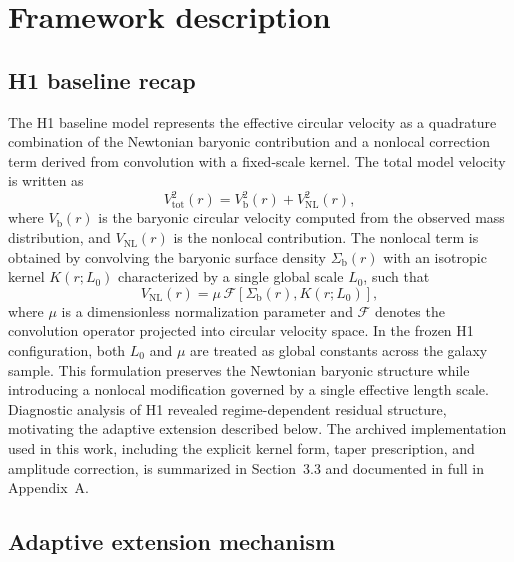 \documentclass[twocolumn,linenumbers]{aastex701}
\begin{document}
\section{Framework description}

\subsection{H1 baseline recap}

The H1 baseline model represents the effective circular velocity as a
quadrature combination of the Newtonian baryonic contribution and a
nonlocal correction term derived from convolution with a fixed-scale
kernel. The total model velocity is written as
\begin{equation}
	V_{\mathrm{tot}}^2(r) = V_{\mathrm{b}}^2(r) + V_{\mathrm{NL}}^2(r),
	\label{eq:vtot}
\end{equation}
where $V_{\mathrm{b}}(r)$ is the baryonic circular velocity computed
from the observed mass distribution, and $V_{\mathrm{NL}}(r)$ is the
nonlocal contribution. The nonlocal term is obtained by convolving the
baryonic surface density $\Sigma_{\mathrm{b}}(r)$ with an isotropic
kernel $K(r; L_0)$ characterized by a single global scale $L_0$, such that
\begin{equation}
	V_{\mathrm{NL}}(r) = \mu \, \mathcal{F}\left[\Sigma_{\mathrm{b}}(r),
	K(r; L_0)\right],
	\label{eq:vnl}
\end{equation}
where $\mu$ is a dimensionless normalization parameter and $\mathcal{F}$
denotes the convolution operator projected into circular velocity space.
In the frozen H1 configuration, both $L_0$ and $\mu$ are treated as global
constants across the galaxy sample. This formulation preserves the Newtonian
baryonic structure while introducing a nonlocal modification governed by a
single effective length scale. Diagnostic analysis of H1 revealed
regime-dependent residual structure, motivating the adaptive extension
described below. The archived implementation used in this work, including
the explicit kernel form, taper prescription, and amplitude correction,
is summarized in Section~3.3 and documented in full in Appendix~A.

\subsection{Adaptive extension mechanism}
\end{document}
